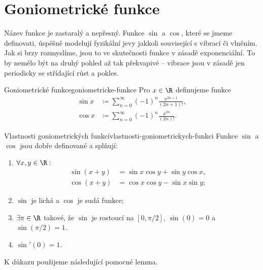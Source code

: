 \section{Goniometrické funkce}
\label{sec:goniometricke-funkce}

Název  funkce je zastaralý a nepřesný. Funkce $\sin$ a $\cos$,
které se jmeme definovati, úspěšně modelují fyzikální jevy jakkoli související s
vibrací či vlněním. Jak si brzy rozmyslíme, jsou to ve skutečnosti funkce v
zásadě exponenciální. To by nemělo být na druhý pohled až tak překvapivé --
vibrace jsou v zásadě jen periodicky se střídající růst a pokles.

\begin{definition}{Goniometrické funkce}{goniometricke-funkce}
 Pro $x \in \R$ definujeme funkce
 \begin{align*}
  \sin x & \coloneqq \sum_{n=0}^{\infty} (-1)^{n} \frac{x^{2n+1}}{(2n+1)!},\\
  \cos x & \coloneqq \sum_{n=0}^{\infty} (-1)^{n} \frac{x^{2n}}{(2n)!}.
 \end{align*}
\end{definition}

\begin{theorem}{Vlastnosti goniometrických
funkcí}{vlastnosti-goniometrickych-funkci}
 Funkce $\sin$ a $\cos$ jsou dobře definované a splňují:
 \begin{enumerate}[label=(G\arabic*)]
  \item $ \forall x,y \in \R:$
  \begin{align*}
   \sin(x+y) &= \sin x \cos y + \sin y \cos x,\\
   \cos(x+y) &= \cos x \cos y - \sin x \sin y;
  \end{align*}
 \item $\sin$ je lichá a $\cos$ je sudá funkce;
 \item $ \exists \pi \in \R$ takové, že $\sin$ je rostoucí na $[0,\pi / 2]$,
  $\sin(0) = 0$ a $\sin(\pi / 2) = 1$.
 \item $\sin'(0) = 1$.
 \end{enumerate}
\end{theorem}

K důkazu použijeme následující pomocné lemma.

